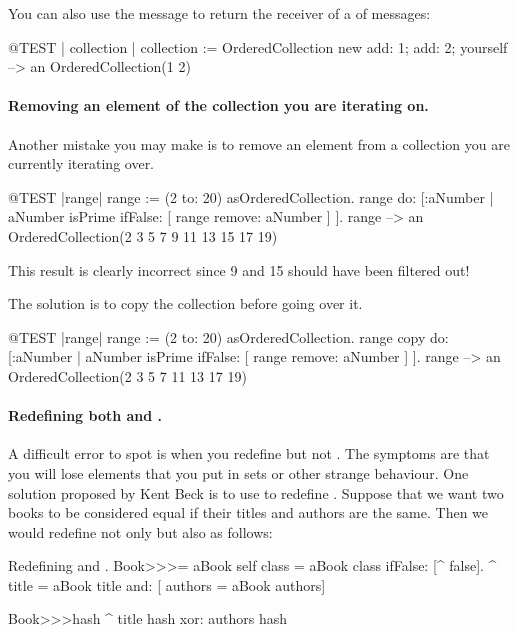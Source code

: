 \documentclass[a4paper,10pt,twoside]{book}
\begin{document}
You can also use the message  to return the receiver of a  of messages:

\begin{code}{@TEST | collection |}
collection := OrderedCollection new add: 1; add: 2; yourself --> an OrderedCollection(1 2)
\end{code}

\paragraph{Removing an element of the collection you are iterating on.} Another mistake you may make is to remove an element from a collection you are currently iterating over.
\begin{code}{@TEST |range|}
range := (2 to: 20) asOrderedCollection.
range do: [:aNumber | aNumber isPrime ifFalse: [ range remove: aNumber ] ].
range --> an OrderedCollection(2 3 5 7 9 11 13 15 17 19)
\end{code}
\noindent
This result is clearly incorrect since 9 and 15 should have been filtered out!

The solution is to copy the collection before going over it.
\begin{code}{@TEST |range|}
range := (2 to: 20) asOrderedCollection.
range copy do: [:aNumber | aNumber isPrime ifFalse: [ range remove: aNumber ] ].
range --> an OrderedCollection(2 3 5 7 11 13 17 19)
\end{code}

\paragraph{Redefining both \ct{=} and .}
A difficult error to spot is when you redefine \ct{=} but not . The symptoms are that you will lose elements that you put in sets or other strange behaviour. One solution proposed by Kent Beck is to use  to redefine .
Suppose that we want two books to be considered equal if their titles and authors are the same.
Then we would redefine not only \ct{=} but also  as follows:

\begin{method}{Redefining \lct{=} and .}
Book>>>= aBook
   self class = aBook class ifFalse: [^ false].
   ^ title = aBook title and: [ authors = aBook authors]

Book>>>hash 
   ^ title hash xor: authors hash
\end{method}
\end{document}
